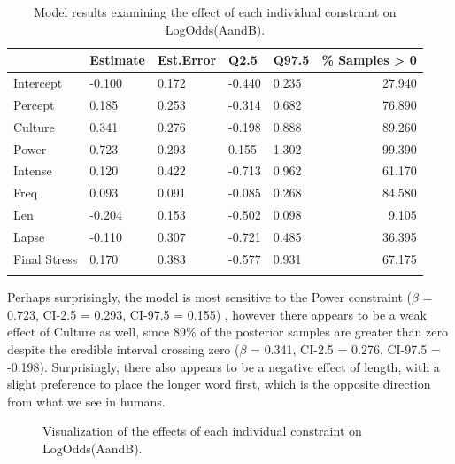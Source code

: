 \documentclass[
  nottoc]{article}
\begin{document}
\begin{longtable}[]{@{}lllllr@{}}

\toprule\noalign{}
& Estimate & Est.Error & Q2.5 & Q97.5 & \% Samples \textgreater{} 0 \\
\midrule\noalign{}
\endhead
\bottomrule\noalign{}
\endlastfoot
Intercept & -0.100 & 0.172 & -0.440 & 0.235 & 27.940 \\
Percept & 0.185 & 0.253 & -0.314 & 0.682 & 76.890 \\
Culture & 0.341 & 0.276 & -0.198 & 0.888 & 89.260 \\
Power & 0.723 & 0.293 & 0.155 & 1.302 & 99.390 \\
Intense & 0.120 & 0.422 & -0.713 & 0.962 & 61.170 \\
Freq & 0.093 & 0.091 & -0.085 & 0.268 & 84.580 \\
Len & -0.204 & 0.153 & -0.502 & 0.098 & 9.105 \\
Lapse & -0.110 & 0.307 & -0.721 & 0.485 & 36.395 \\
Final Stress & 0.170 & 0.383 & -0.577 & 0.931 & 67.175 \\


\caption{\label{tbl-exp1m2}Model results examining the effect of each
individual constraint on LogOdds(AandB).}

\tabularnewline
\end{longtable}

Perhaps surprisingly, the model is most sensitive to the Power
constraint (\(\beta\) = 0.723, CI-2.5 = 0.293, CI-97.5 = 0.155) ,
however there appears to be a weak effect of Culture as well, since 89\%
of the posterior samples are greater than zero despite the credible
interval crossing zero (\(\beta\) = 0.341, CI-2.5 = 0.276, CI-97.5 =
-0.198). Surprisingly, there also appears to be a negative effect of
length, with a slight preference to place the longer word first, which
is the opposite direction from what we see in humans.

\begin{figure}


\caption{\label{fig-exp1m2}Visualization of the effects of each
individual constraint on LogOdds(AandB).}

\end{figure}%
\end{document}
